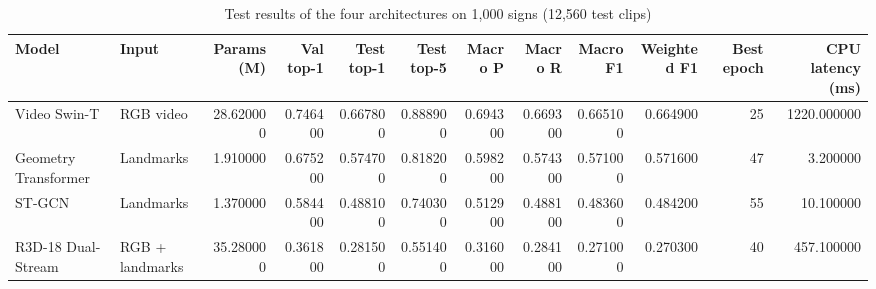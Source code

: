 \begin{table}[htbp]
\caption{Test results of the four architectures on 1,000 signs (12,560 test clips)}
\label{tab:table01_model_comparison_1000}
\begin{tabular}{llrrrrrrrrrr}
\toprule
Model & Input & Params (M) & Val top-1 & Test top-1 & Test top-5 & Macro P & Macro R & Macro F1 & Weighted F1 & Best epoch & CPU latency (ms) \\
\midrule
Video Swin-T & RGB video & 28.620000 & 0.746400 & 0.667800 & 0.888900 & 0.694300 & 0.669300 & 0.665100 & 0.664900 & 25 & 1220.000000 \\
Geometry Transformer & Landmarks & 1.910000 & 0.675200 & 0.574700 & 0.818200 & 0.598200 & 0.574300 & 0.571000 & 0.571600 & 47 & 3.200000 \\
ST-GCN & Landmarks & 1.370000 & 0.584400 & 0.488100 & 0.740300 & 0.512900 & 0.488100 & 0.483600 & 0.484200 & 55 & 10.100000 \\
R3D-18 Dual-Stream & RGB + landmarks & 35.280000 & 0.361800 & 0.281500 & 0.551400 & 0.316000 & 0.284100 & 0.271000 & 0.270300 & 40 & 457.100000 \\
\bottomrule
\end{tabular}
\end{table}
